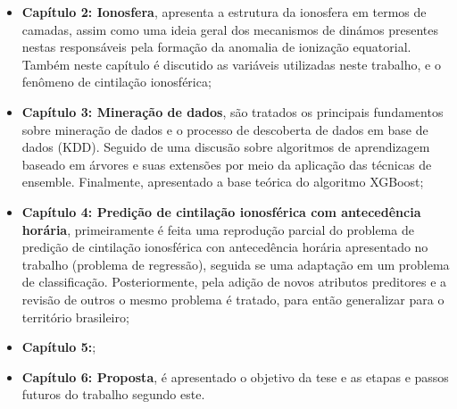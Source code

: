 \begin{itemize}
\item {\bf Capítulo 2: Ionosfera}, apresenta a estrutura da ionosfera em termos de camadas, assim como uma ideia geral dos mecanismos de dinámos presentes nestas responsáveis pela formação da anomalia de ionização equatorial. Também neste capítulo é discutido as variáveis utilizadas neste trabalho, e o fenômeno de cintilação ionosférica;
\item {\bf Capítulo 3: Mineração de dados}, são tratados os principais fundamentos sobre mineração de dados e o processo de descoberta de dados em base de dados (KDD). Seguido de uma discusão sobre algoritmos de aprendizagem baseado em árvores e suas extensões por meio da aplicação das técnicas de ensemble. Finalmente, apresentado a base teórica do algoritmo XGBoost;
\item {\bf Capítulo 4: Predição de cintilação ionosférica com antecedência horária}, primeiramente é feita uma reprodução parcial do problema de predição de cintilação ionosférica con antecedência horária apresentado no trabalho \cite{REZENDE:2009} (problema de regressão), seguida se uma adaptação em um problema de classificação. Posteriormente, pela adição de novos atributos preditores e a revisão de outros o mesmo problema é tratado, para então generalizar para o território brasileiro;
\item {\bf Capítulo 5:};
\item {\bf Capítulo 6: Proposta}, é apresentado o objetivo da tese e as etapas e passos futuros do trabalho segundo este.
\end{itemize}
